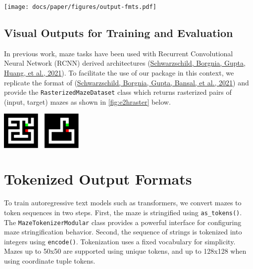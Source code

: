 \documentclass[10pt,a4paper,onecolumn]{article}
\let\origfigure\figure
\let\endorigfigure\endfigure
\renewenvironment{figure}[1][2] {
    \expandafter\origfigure\expandafter[H]
} {
    \endorigfigure
}
\begin{document}
\begin{figure}
\hypertarget{fig:visualoutputs}{%
\centering
\texttt{[image: docs/paper/figures/output-fmts.pdf]}
\caption{Various output formats. Top row (left to right): ASCII diagram,
rasterized pixel grid, and advanced display.}\label{fig:visualoutputs}
}
\end{figure}

\hypertarget{training}{%
\subsection{Visual Outputs for Training and Evaluation}\label{training}}

In previous work, maze tasks have been used with Recurrent Convolutional
Neural Network (RCNN) derived architectures
(\protect\hyperlink{ref-deepthinking}{Schwarzschild, Borgnia, Gupta,
Huang, et al., 2021}). To facilitate the use of our package in this
context, we replicate the format of
(\protect\hyperlink{ref-easy_to_hard}{Schwarzschild, Borgnia, Gupta,
Bansal, et al., 2021}) and provide the \texttt{RasterizedMazeDataset}
class which returns rasterized pairs of (input, target) mazes as shown
in \autoref{fig:e2hraster} below.

\begin{figure}
\hypertarget{fig:e2hraster}{%
\centering
\includegraphics[width=0.3\textwidth,height=\textheight]{docs/paper/figures/maze-raster-input-target.pdf}
\caption{Input is the rasterized maze without the path marked (left),
and provide as a target the maze with all but the correct path removed.
Configuration options exist to adjust whether endpoints are included and
if empty cells should be filled in.}\label{fig:e2hraster}
}
\end{figure}

\hypertarget{tokenized-output-formats}{%
\section{Tokenized Output Formats}\label{tokenized-output-formats}}

To train autoregressive text models such as transformers, we convert
mazes to token sequences in two steps. First, the maze is stringified
using \texttt{as\_tokens()}. The \texttt{MazeTokenizerModular} class
provides a powerful interface for configuring maze stringification
behavior. Second, the sequence of strings is tokenized into integers
using \texttt{encode()}. Tokenization uses a fixed vocabulary for
simplicity. Mazes up to 50x50 are supported using unique tokens, and up
to 128x128 when using coordinate tuple tokens.
\end{document}
